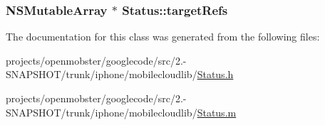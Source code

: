 \label{interface_status_ab155041b270431133981aaf082955d42}
\hypertarget{interface_status_ab226762144cd8525a8388e5ea30e401b}{
\subsubsection[{target\-Refs}]{\setlength{\rightskip}{0pt plus 5cm}\-N\-S\-Mutable\-Array $\ast$ \-Status\-::target\-Refs}}
\label{interface_status_ab226762144cd8525a8388e5ea30e401b}


\-The documentation for this class was generated from the following files\-:\begin{DoxyCompactItemize}
\item 
projects/openmobster/googlecode/src/2.-\/\-S\-N\-A\-P\-S\-H\-O\-T/trunk/iphone/mobilecloudlib/\hyperlink{_status_8h}{\-Status.\-h}\item 
projects/openmobster/googlecode/src/2.-\/\-S\-N\-A\-P\-S\-H\-O\-T/trunk/iphone/mobilecloudlib/\hyperlink{_status_8m}{\-Status.\-m}\end{DoxyCompactItemize}
